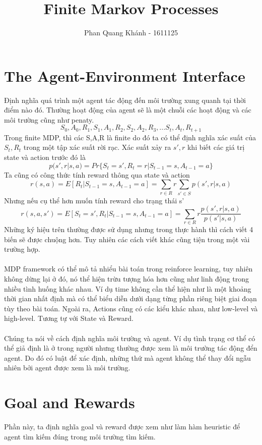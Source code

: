 \documentclass[12pt,a4paper]{article}
\title{Finite Markov Processes}
\author{Phan Quang Khánh - 1611125}
\begin{document}
\maketitle
\section{The Agent-Environment Interface}
Định nghĩa quá trình một agent tác động đến môi trường xung quanh tại thời điểm nào đó. Thường hoạt động của agent sẽ là một chuỗi các hoạt động và các môi trường cũng như penaty.
\[S_0,A_0,R_1,S_1,A_1,R_2,S_2,A_2,R_3,...S_t,A_t,R_{t+1}\]
Trong finite MDP, thì các S,A,R là finite do đó ta có thể định nghĩa xác suất của $S_t,R_t$ trong một tập xác suất rời rạc. Xác suất xảy ra $s', r$ khi biết các giá trị state và action trước đó là
\[p(s',r|s,a) = Pr\{S_t = s', R_t = r|S_{t-1} = s, A_{t-1} = a\}\]
Ta cũng có công thức tính reward thông qua state và action
\[r(s,a) = E[R_t| S_{t-1} = s, A_{t-1} = a] = \sum_{r \in R}r\sum_{s'\in S}p(s',r|s,a)\]
Nhưng nếu cụ thể hơn muốn tính reward cho trạng thái s'
\[r(s,a,s') = E[S_t = s',R_t|S_{t-1} = s, A_{t-1} = a] = \sum_{r \in R}r\dfrac{p(s',r|s,a)}{p(s'|s,a)}\]
Những ký hiệu trên thường được sử dụng nhưng trong thực hành thì cách viết 4 biến sẽ được chuộng hơn. Tuy nhiên các cách viết khác cũng tiện trong một vài trường hợp.\\
\\
MDP framework có thể mô tả nhiểu bài toán trong reinforce learning, tuy nhiên không dừng lại ở đó, nó thể hiện trừu tượng hóa hơn cũng như linh động trong nhiều tình huống khác nhau. Ví dụ time không cần thể hiện như là một khoảng thời gian nhất định mà có thể biểu diễn dưới dạng từng phần riêng biệt giai đoạn tùy theo bài toán. Ngoài ra, Actions cũng có các kiểu khác nhau, như low-level và high-level. Tương tự với State và Reward.\\
\\
Chúng ta nói về cách định nghĩa môi trường và agent. Ví dụ tình trạng cơ thể có thể giả định là ở trong người nhưng thường được xem là môi trường tác động đển agent. Do đó có luật để xác định, những thứ mà agent không thể thay đổi ngẫu nhiên bởi agent được xem là môi trường.\\
\section{Goal and Rewards}
Phần này, ta định nghĩa goal và reward được xem như làm hàm heuristic để agent tìm kiếm đúng trong môi trường tìm kiếm.
\end{document}
